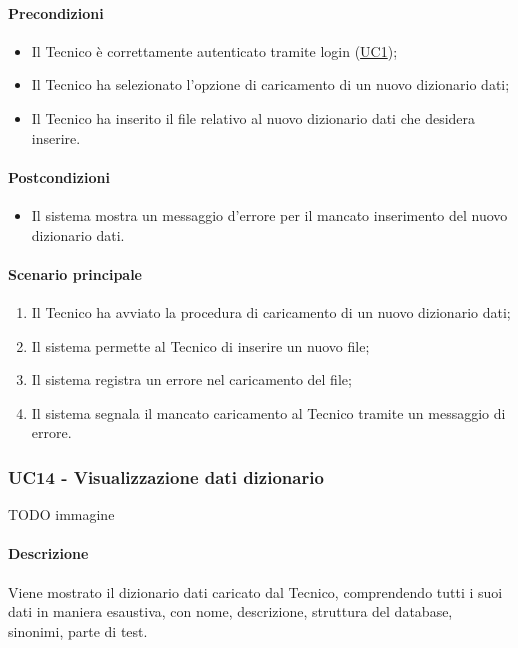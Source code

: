\paragraph*{Precondizioni}
\begin{itemize}
  \item Il Tecnico è correttamente autenticato tramite login (\hyperref[UC1]{UC1});
  \item Il Tecnico ha selezionato l’opzione di caricamento di un nuovo dizionario dati;
  \item Il Tecnico ha inserito il file relativo al nuovo dizionario dati che desidera inserire.
  
\end{itemize}
\paragraph*{Postcondizioni}
\begin{itemize}
  \item Il sistema mostra un messaggio d’errore per il mancato inserimento del nuovo dizionario dati.
\end{itemize}
\paragraph*{Scenario principale}
\begin{enumerate}
  \item Il Tecnico ha avviato la procedura di caricamento di un nuovo dizionario dati;
  \item Il sistema permette al Tecnico di inserire un nuovo file;
  \item Il sistema registra un errore nel caricamento del file;
  \item Il sistema segnala il mancato caricamento al Tecnico tramite un messaggio di errore.  
\end{enumerate}


\subsubsection{UC14 - Visualizzazione dati dizionario}\label{UC14}
TODO immagine
\paragraph*{Descrizione} Viene mostrato il dizionario dati caricato dal Tecnico, comprendendo tutti i suoi dati in maniera esaustiva, con nome, descrizione, struttura del database, sinonimi, parte di test.

